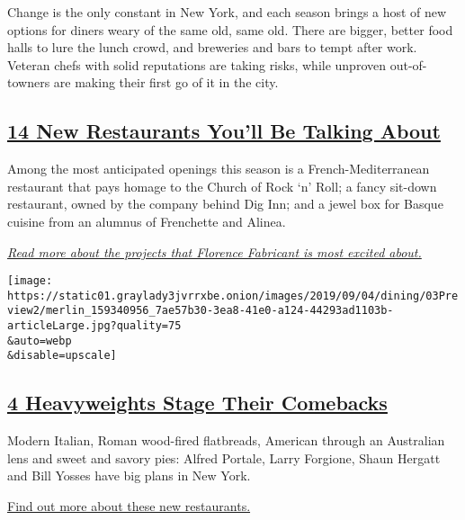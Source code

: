 Change is the only constant in New York, and each season brings a host
of new options for diners weary of the same old, same old. There are
bigger, better food halls to lure the lunch crowd, and breweries and
bars to tempt after work. Veteran chefs with solid reputations are
taking risks, while unproven out-of-towners are making their first go of
it in the city.

\hypertarget{14-new-restaurants-youll-be-talking-about}{%
\subsection{\texorpdfstring{\href{https://www.nytimes3xbfgragh.onion/2019/09/03/dining/new-restaurants-nyc.html}{14
New Restaurants You'll Be Talking
About}}{14 New Restaurants You'll Be Talking About}}\label{14-new-restaurants-youll-be-talking-about}}

Among the most anticipated openings this season is a
French-Mediterranean restaurant that pays homage to the Church of Rock
`n' Roll; a fancy sit-down restaurant, owned by the company behind Dig
Inn; and a jewel box for Basque cuisine from an alumnus of Frenchette
and Alinea.

\href{https://www.nytimes3xbfgragh.onion/2019/09/03/dining/new-restaurants-nyc.html}{\emph{Read
more about the projects that Florence Fabricant is most excited about.}}

\texttt{[image: https://static01.graylady3jvrrxbe.onion/images/2019/09/04/dining/03Preview2/merlin\_159340956\_7ae57b30-3ea8-41e0-a124-44293ad1103b-articleLarge.jpg?quality=75\\\&auto=webp\\\&disable=upscale]}

\hypertarget{4-heavyweights-stage-their-comebacks}{%
\subsection{\texorpdfstring{\href{https://www.nytimes3xbfgragh.onion/2019/09/03/dining/nyc-restaurants-marc-forgione-alfred-portale.html}{4
Heavyweights Stage Their
Comebacks}}{4 Heavyweights Stage Their Comebacks}}\label{4-heavyweights-stage-their-comebacks}}

Modern Italian, Roman wood-fired flatbreads, American through an
Australian lens and sweet and savory pies: Alfred Portale, Larry
Forgione, Shaun Hergatt and Bill Yosses have big plans in New York.

\href{https://www.nytimes3xbfgragh.onion/2019/09/03/dining/nyc-restaurants-marc-forgione-alfred-portale.html}{Find
out more about these new restaurants.}

